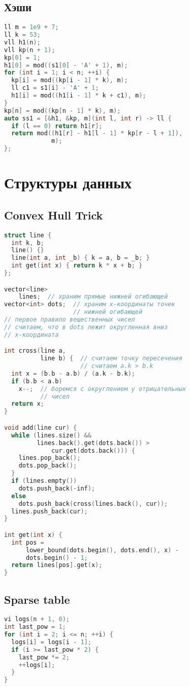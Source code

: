 \documentclass[10pt,a4paper,landscape,twosided]{extarticle}
\begin{document}
\begin{multicols}{3}
\subsection{Хэши}
\begin{lstlisting}[language=C++]
ll m = 1e9 + 7;
ll k = 53;
vll h1(n);
vll kp(n + 1);
kp[0] = 1;
h1[0] = mod((s1[0] - 'A' + 1), m);
for (int i = 1; i < n; ++i) {
  kp[i] = mod((kp[i - 1] * k), m);
  ll c1 = s1[i] - 'A' + 1;
  h1[i] = mod((h1[i - 1] * k + c1), m);
}
kp[n] = mod((kp[n - 1] * k), m);
auto ss1 = [&h1, &kp, m](int l, int r) -> ll {
  if (l == 0) return h1[r];
  return mod((h1[r] - h1[l - 1] * kp[r - l + 1]),
             m);
};
\end{lstlisting}

\section{Структуры данных}

\subsection{Convex Hull Trick}
\begin{lstlisting}[language=C++]
struct line {
  int k, b;
  line() {}
  line(int a, int _b) { k = a, b = _b; }
  int get(int x) { return k * x + b; }
};

vector<line>
    lines;  // храним прямые нижней огибающей
vector<int> dots;  // храним x-координаты точек
                   // нижней огибающей
// первое правило вещественных чисел
// считаем, что в dots лежит округленная вниз
// x-координата

int cross(line a,
          line b) {  // считаем точку пересечения
                     // считаем a.k > b.k
  int x = (b.b - a.b) / (a.k - b.k);
  if (b.b < a.b)
    x--;  // боремся с округлением у отрицательных
          // чисел
  return x;
}

void add(line cur) {
  while (lines.size() &&
         lines.back().get(dots.back()) >
             cur.get(dots.back())) {
    lines.pop_back();
    dots.pop_back();
  }
  if (lines.empty())
    dots.push_back(-inf);
  else
    dots.push_back(cross(lines.back(), cur));
  lines.push_back(cur);
}

int get(int x) {
  int pos =
      lower_bound(dots.begin(), dots.end(), x) -
      dots.begin() - 1;
  return lines[pos].get(x);
}
\end{lstlisting}

\subsection{Sparse table}
\begin{lstlisting}[language=C++]
vi logs(n + 1, 0);
int last_pow = 1;
for (int i = 2; i <= n; ++i) {
  logs[i] = logs[i - 1];
  if (i >= last_pow * 2) {
    last_pow *= 2;
    ++logs[i];
  }
}


\end{lstlisting}
\end{multicols}
\end{document}
